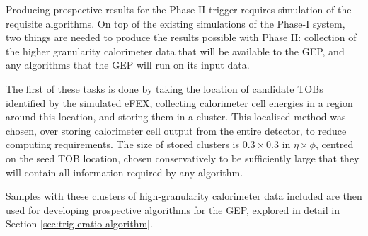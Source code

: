 
Producing prospective results for the Phase-II trigger requires simulation of
the requisite algorithms. On top of the existing simulations of the Phase-I
system, two things are needed to produce the results possible with Phase
II: collection of the higher granularity calorimeter data that will be available
to the \ac{GEP}, and any algorithms that the \ac{GEP} will run on its input
data.

The first of these tasks is done by taking the location of \egamma candidate
\acp{TOB} identified by the simulated \ac{eFEX}, collecting calorimeter cell
energies in a region around this location, and storing them in a cluster. This
localised method was chosen, over storing calorimeter cell output from the
entire detector, to reduce computing requirements. The size of stored clusters
is $0.3\times0.3$ in $\eta\times\phi$, centred on the seed \ac{TOB} location,
chosen conservatively to be sufficiently large that they will contain all
information required by any algorithm.

Samples with these clusters of high-granularity calorimeter data included are
then used for developing prospective algorithms for the \ac{GEP}, explored in
detail in Section \ref{sec:trig-eratio-algorithm}.
